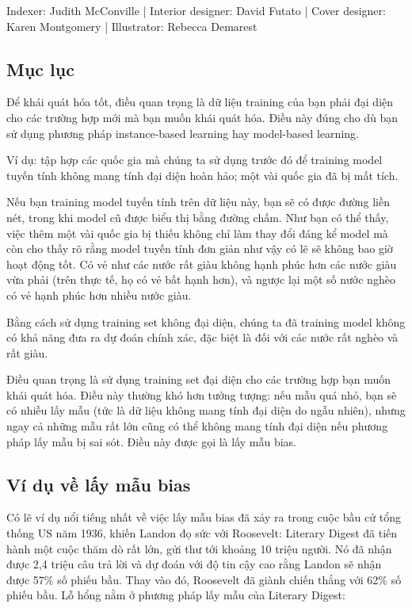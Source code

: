 Indexer: Judith McConville | Interior designer: David Futato | Cover designer: Karen Montgomery | Illustrator: Rebecca Demarest

\subsection{Mục lục}

Để khái quát hóa tốt, điều quan trọng là dữ liệu training của bạn phải đại diện cho các trường hợp mới mà bạn muốn khái quát hóa. Điều này đúng cho dù bạn sử dụng phương pháp instance-based learning hay model-based learning.

Ví dụ: tập hợp các quốc gia mà chúng ta sử dụng trước đó để training model tuyến tính không mang tính đại diện hoàn hảo; một vài quốc gia đã bị mất tích.

Nếu bạn training model tuyến tính trên dữ liệu này, bạn sẽ có được đường liền nét, trong khi model cũ được biểu thị bằng đường chấm. Như bạn có thể thấy, việc thêm một vài quốc gia bị thiếu không chỉ làm thay đổi đáng kể model mà còn cho thấy rõ rằng model tuyến tính đơn giản như vậy có lẽ sẽ không bao giờ hoạt động tốt. Có vẻ như các nước rất giàu không hạnh phúc hơn các nước giàu vừa phải (trên thực tế, họ có vẻ bất hạnh hơn), và ngược lại một số nước nghèo có vẻ hạnh phúc hơn nhiều nước giàu.

Bằng cách sử dụng training set không đại diện, chúng ta đã training model không có khả năng đưa ra dự đoán chính xác, đặc biệt là đối với các nước rất nghèo và rất giàu.

Điều quan trọng là sử dụng training set đại diện cho các trường hợp bạn muốn khái quát hóa. Điều này thường khó hơn tưởng tượng: nếu mẫu quá nhỏ, bạn sẽ có nhiễu lấy mẫu (tức là dữ liệu không mang tính đại diện do ngẫu nhiên), nhưng ngay cả những mẫu rất lớn cũng có thể không mang tính đại diện nếu phương pháp lấy mẫu bị sai sót. Điều này được gọi là lấy mẫu bias.

\subsection{Ví dụ về lấy mẫu bias}

Có lẽ ví dụ nổi tiếng nhất về việc lấy mẫu bias đã xảy ra trong cuộc bầu cử tổng thống US năm 1936, khiến Landon đọ sức với Roosevelt: Literary Digest đã tiến hành một cuộc thăm dò rất lớn, gửi thư tới khoảng 10 triệu người. Nó đã nhận được 2,4 triệu câu trả lời và dự đoán với độ tin cậy cao rằng Landon sẽ nhận được 57\% số phiếu bầu. Thay vào đó, Roosevelt đã giành chiến thắng với 62\% số phiếu bầu. Lỗ hổng nằm ở phương pháp lấy mẫu của Literary Digest:

